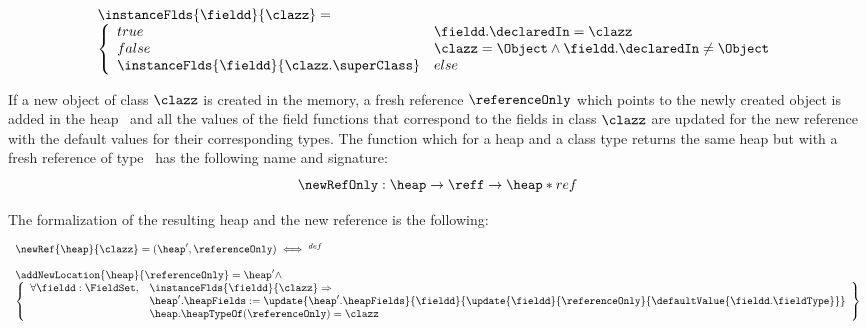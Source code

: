 $$
 \begin{array}{l}
       \instanceFlds{\fieldd}{\clazz } = \\
       \left\{\begin{array}{ll}
                    true  & \fieldd.\declaredIn = \clazz \\
		    false & \clazz = \Object \wedge \fieldd.\declaredIn \neq \Object \\
		    \instanceFlds{\fieldd}{\clazz.\superClass} & else
       \end{array}\right.
 \end{array}
$$



 If a new object of class $\clazz$ is created in the memory,
 a fresh reference $\referenceOnly$  which points to the newly created object is added in the heap \heap \ 
 and all the values of the field functions that correspond to the fields in class $\clazz$ 
 are updated for the new reference with the default values for their corresponding types.
 The function which for a heap \heap and a class type \clazz returns the same heap but with a fresh reference of
 type \clazz \ has the following name and signature:
 $$ \newRefOnly :  \heap \rightarrow \reff \rightarrow  \heap * ref $$

 The formalization of the resulting heap and the new reference is the following:



 $$  \begin{array}{l}
            \newRef{\heap}{\clazz} = (\heap',\referenceOnly )     \iff^{def} \\
	    \\
	    \addNewLocation{\heap}{\referenceOnly } = \heap' \wedge \\
	    
            \left\{\begin{array}{ll}
	           \forall  \fieldd : \FieldSet, &\instanceFlds{\fieldd}{\clazz} \Rightarrow \\
                                                 & \heap'.\heapFields := 
			                           \update{\heap'.\heapFields}{\fieldd}{\update{\fieldd}{\referenceOnly}{ \defaultValue{\fieldd.\fieldType }}}\\
			                        & \heap.\heapTypeOf( \referenceOnly) = \clazz 
                                                
      \end{array}\right\}
	  
     \end{array} $$





